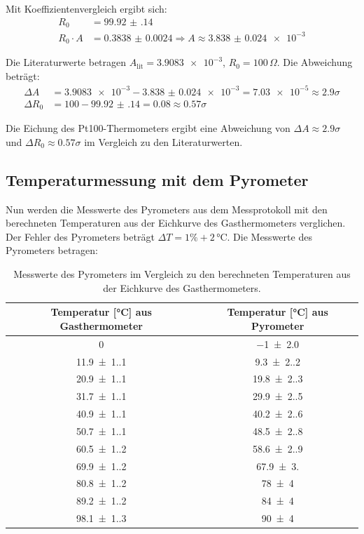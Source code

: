 \documentclass[12pt,a4paper,titlepage]{scrartcl}
\numberwithin{equation}{section}
\numberwithin{table}{section}
\numberwithin{figure}{section}
\begin{document}
Mit Koeffizientenvergleich ergibt sich:
\begin{align}
    R_0 &= \num{99.92(14)}\\
    R_0\cdot A &= \num{0.3838(24)} \Rightarrow A \approx \num{3.838(24)e-3}
\end{align}

Die Literaturwerte betragen $A_\text{lit} = \num{3.9083e-3}$, $R_0 = 100\,\Omega$. Die Abweichung beträgt:
\begin{align}
    \Delta A &= \num{3.9083e-3} - \num{3.838(24)e-3} = \num{7.03e-5} \approx 2.9\sigma\\
    \Delta R_0 &= 100 - \num{99.92(14)} = \num{0.08} \approx 0.57\sigma
\end{align}


\begin{resultbox}[Ergebnis]
    Die Eichung des Pt100-Thermometers ergibt eine Abweichung von $\Delta A \approx 2.9\sigma$ und $\Delta R_0 \approx 0.57\sigma$ im Vergleich zu den Literaturwerten.
\end{resultbox}


\subsection{Temperaturmessung mit dem Pyrometer}

Nun werden die Messwerte des Pyrometers aus dem Messprotokoll mit den berechneten Temperaturen aus der Eichkurve des Gasthermometers verglichen. 
Der Fehler des Pyrometers beträgt $\Delta T = 1\% + 2\,\si{\degreeCelsius}$.
Die Messwerte des Pyrometers betragen:
\begin{table}[H]
    \centering
    \caption{Messwerte des Pyrometers im Vergleich zu den berechneten Temperaturen aus der Eichkurve des Gasthermometers.}
    \begin{tabular}{cc}
        \toprule
        \textbf{Temperatur [°C] aus Gasthermometer} & \textbf{Temperatur [°C] aus Pyrometer} \\
        \midrule
        \num{0} & \num{-1(2.0)}\\
        \num{11.9(1.1)} & \num{9.3(2.2)}\\
        \num{20.9(1.1)} & \num{19.8(2.3)}\\
        \num{31.7(1.1)} & \num{29.9(2.5)}\\
        \num{40.9(1.1)} & \num{40.2(2.6)}\\
        \num{50.7(1.1)} & \num{48.5(2.8)}\\
        \num{60.5(1.2)} & \num{58.6(2.9)}\\
        \num{69.9(1.2)} & \num{67.9(3.0)}\\
        \num{80.8(1.2)} & \num{78(4)}\\
        \num{89.2(1.2)} & \num{84(4)}\\
        \num{98.1(1.3)} & \num{90(4)}\\
        \bottomrule
    \end{tabular}
\end{table}
\end{document}
